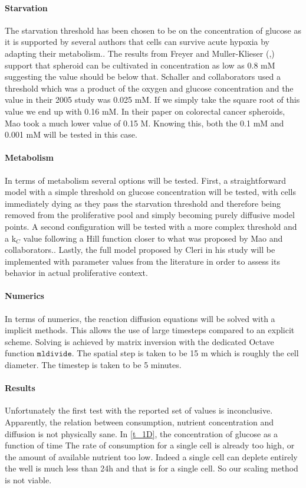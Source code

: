 \documentclass[11pt,a4paper]{article}
\begin{document}
\paragraph{Starvation}
The starvation threshold has been chosen to be on the concentration of glucose as it is supported by several authors that cells can survive acute hypoxia by adapting their metabolism.\cite{McKeown2014}\cite{Richards2016}. The results from Freyer and Muller-Klieser (\cite{MuellerKlieser1984},\cite{Freyer1986}) support that spheroid can be cultivated in concentration as low as 0.8 mM suggesting the value should be below that. Schaller and collaborators used a threshold which was a product of the oxygen and glucose concentration and the value in their 2005 study was 0.025 mM. If we simply take the square root of this value we end up with 0.16 mM.\cite{Kempf2005} In their paper on colorectal cancer spheroids, Mao took a much lower value of  0.15 \textmu M. \cite{Mao2018} Knowing this, both the 0.1 mM and 0.001 mM will be tested in this case.

\paragraph{Metabolism}
In terms of metabolism several options will be tested. First, a straightforward model with a simple threshold on glucose concentration will be tested, with cells immediately dying as they pass the starvation threshold and therefore being removed from the proliferative pool and simply becoming purely diffusive model points. A second configuration will be tested with a more complex threshold and a k$_{C}$ value following a Hill function closer to what was proposed by Mao and collaborators.\cite{Mao2018}. Lastly, the full model proposed by Cleri in his study will be implemented with parameter values from the literature in order to assess its behavior in actual proliferative context.

\paragraph{Numerics}
In terms of numerics, the reaction diffusion equations will be solved with a implicit methods. This allows the use of large timesteps compared to an explicit scheme. Solving is achieved by matrix inversion with the dedicated Octave function $\mathtt{mldivide}$. The spatial step is taken to be 15 \textmu m which is roughly the cell diameter. The timestep is taken to be 5 minutes. 

\paragraph{Results}
Unfortunately the first test with the reported set of values is inconclusive. Apparently, the relation between consumption, nutrient concentration and diffusion is not physically sane. In \ref{t_1D}, the concentration of glucose as a function of time  The rate of consumption for a single cell is already too high, or the amount of available nutrient too low. Indeed a single cell can deplete entirely the well is much less than 24h and that is for a single cell. So our scaling method is not viable. 
\end{document}
